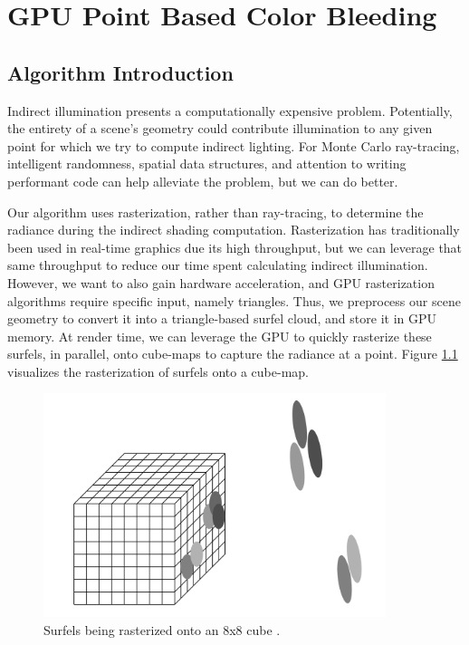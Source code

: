 \chapter{GPU Point Based Color Bleeding}

\section{Algorithm Introduction}

Indirect illumination presents a computationally expensive problem. Potentially, the entirety of a scene's geometry could contribute illumination to any given point for which we try to compute indirect lighting. For Monte Carlo ray-tracing, intelligent randomness, spatial data structures, and attention to writing performant code can help alleviate the problem, but we can do better.

Our algorithm uses rasterization, rather than ray-tracing, to determine the radiance during the indirect shading computation. Rasterization has traditionally been used in real-time graphics due its high throughput, but we can leverage that same throughput to reduce our time spent calculating indirect illumination. However, we want to also gain hardware acceleration, and GPU rasterization algorithms require specific input, namely triangles. Thus, we preprocess our scene geometry to convert it into a triangle-based surfel cloud, and store it in GPU memory. At render time, we can leverage the GPU to quickly rasterize these surfels, in parallel, onto cube-maps to capture the radiance at a point. Figure \ref{fig:surfel_raster} visualizes the rasterization of surfels onto a cube-map.

\begin{figure}[h!]
   \centering
   \includegraphics[width=100mm]{../img/surfel_raster.png}
   \captionfonts
   \caption[Rasterizing surfels]{Surfels being rasterized onto an 8x8 cube \cite{bib:christensen_slides}.}
   \label{fig:surfel_raster}
\end{figure}


